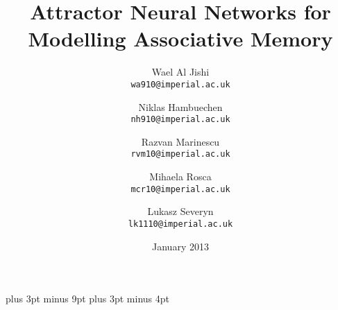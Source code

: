 \documentclass[11pt,a4paper,oneside]{report}
\title{Attractor Neural Networks for Modelling Associative Memory}
\date{January 2013}
\author{
  Wael Al Jishi\\
  \texttt{wa910@imperial.ac.uk}
  \and
  Niklas Hambuechen\\
  \texttt{nh910@imperial.ac.uk}
  \and
  Razvan Marinescu\\
  \texttt{rvm10@imperial.ac.uk}
  \and
  Mihaela Rosca\\
  \texttt{mcr10@imperial.ac.uk}
  \and
  Lukasz Severyn\\
  \texttt{lk1110@imperial.ac.uk}
}
\begin{document}
\belowdisplayskip=12pt plus 3pt minus 9pt
\belowdisplayshortskip=7pt plus 3pt minus 4pt







\maketitle{}


\renewcommand{\abstractname}{Executive Summary}



\tableofcontents



















\nocite{*} %





\appendix



\end{document}
